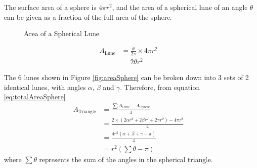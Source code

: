 \documentclass[12pt]{report}
\begin{document}
The surface area of a sphere is $4\pi r^2$, and the area of a spherical lune of an angle $\theta$ can be given as a fraction of the full area of the sphere.
\begin{figure}[H]
\centering
{}
\caption{Area of a Spherical Lune}
\end{figure}
\begin{equation}
\begin{split}
    A_{\text{Lune}}&=\frac{\theta}{2\pi}\times 4\pi r^2\\
    &=2\theta r^2
\end{split}
\end{equation}

The 6 lunes shown in Figure \ref{fig:areaSphere} can be broken down into 3 sets of 2 identical lunes, with angles $\alpha$, $\beta$ and $\gamma$. Therefore, from equation \ref{eq:totalAreaSphere}
\begin{equation}
\begin{split}
    A_{\text{Triangle}}&=\frac{\displaystyle\sum A_{\text{Lune}}-A_{\text{Sphere}}}{4}\\
    &=\frac{2\times\left(2\alpha r^2+2\beta r^2+2\gamma r^2\right)-4\pi r^2}{4}\\
    &=\frac{4r^2\left(\alpha+\beta+\gamma-\pi\right)}{4}\\
    &=r^2\left(\displaystyle\sum\theta-\pi\right)
\end{split}
\end{equation}
where $\displaystyle\sum\theta$ represents the sum of the angles in the spherical triangle.
\end{document}

